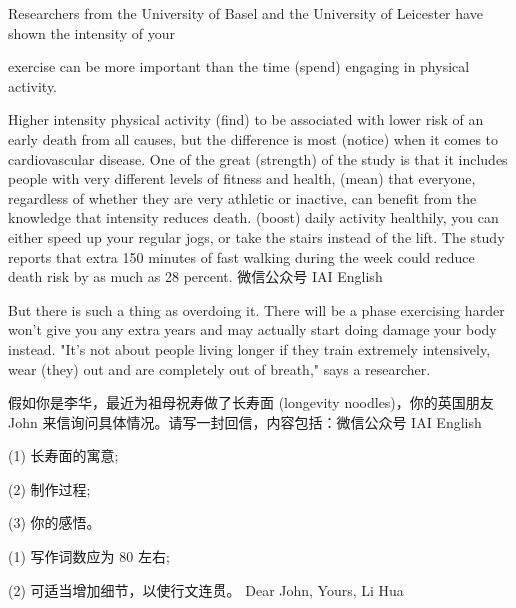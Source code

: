 \documentclass{英语试卷}
\begin{document}
\par Researchers from the University of Basel and the University of Leicester have shown the intensity of your\par
\par exercise can be more important than the time  (spend) engaging in physical activity.\par
\par Higher intensity physical activity (find) to be associated with lower risk of an early death from all causes, but the difference is most (notice) when it comes to cardiovascular disease. One of the great (strength) of the study is that it includes people with very different levels of fitness and health, (mean) that everyone, regardless of whether they are very athletic or inactive, can benefit from the knowledge that intensity reduces death. (boost) daily activity healthily, you can either speed up your regular jogs, or take the stairs instead of the lift. The study reports that  extra 150 minutes of fast walking during the week could reduce death risk by as much as 28 percent. 微信公众号 IAI English\par
\par But there is such a thing as overdoing it. There will be a phase  exercising harder won't give you any extra years and may actually start doing damage  your body instead. "It's not about people living longer if they train extremely intensively, wear  (they) out and are completely out of breath," says a researcher.\par
{}
\par 假如你是李华，最近为祖母祝寿做了长寿面 (longevity noodles)，你的英国朋友 John 来信询问具体情况。请写一封回信，内容包括：微信公众号 IAI English\par
\par (1) 长寿面的寓意;\par
\par (2) 制作过程;\par
\par (3) 你的感悟。\par
\par (1) 写作词数应为 80 左右;\par
\par (2) 可适当增加细节，以使行文连贯。 Dear John, Yours, Li Hua\par
{}
\end{document}
